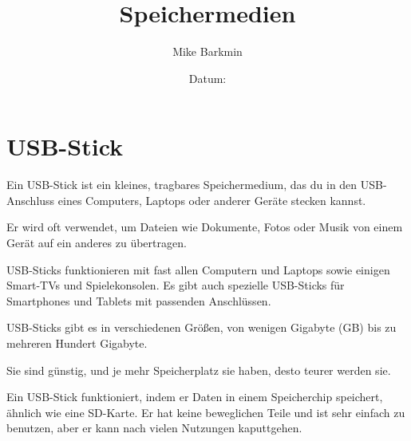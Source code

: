 \documentclass[a4paper,14pt]{scrartcl}
\title{Speichermedien}
\author{Mike Barkmin}
\date{Datum: \hspace{1.5cm}}
\begin{document}
\section*{ USB-Stick}

Ein USB-Stick ist ein kleines, tragbares Speichermedium, das du in den USB-Anschluss eines Computers, Laptops oder anderer Geräte stecken kannst. 

Er wird oft verwendet, um Dateien wie Dokumente, Fotos oder Musik von einem Gerät auf ein anderes zu übertragen. 

USB-Sticks funktionieren mit fast allen Computern und Laptops sowie einigen Smart-TVs und Spielekonsolen. Es gibt auch spezielle USB-Sticks für Smartphones und Tablets mit passenden Anschlüssen. 

USB-Sticks gibt es in verschiedenen Größen, von wenigen Gigabyte (GB) bis zu mehreren Hundert Gigabyte. 

Sie sind günstig, und je mehr Speicherplatz sie haben, desto teurer werden sie.

Ein USB-Stick funktioniert, indem er Daten in einem Speicherchip speichert, ähnlich wie eine SD-Karte. Er hat keine beweglichen Teile und ist sehr einfach zu benutzen, aber er kann nach vielen Nutzungen kaputtgehen.
\end{document}
